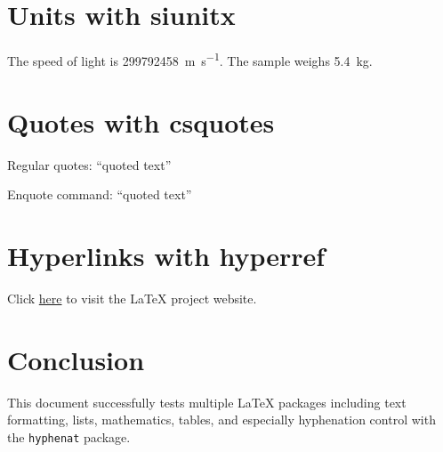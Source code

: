 \documentclass{article}
\begin{document}
    \section{Units with siunitx}
    The speed of light is \SI{299792458}{\meter\per\second}.
    The sample weighs \SI{5.4}{\kilo\gram}.

    \section{Quotes with csquotes}
    Regular quotes: ``quoted text''

    Enquote command: \enquote{quoted text}

    \section{Hyperlinks with hyperref}
    Click \href{https://www.latex-project.org/}{here} to visit the LaTeX project website.

    \section{Conclusion}
    This document successfully tests multiple LaTeX packages including text formatting, lists, mathematics, tables, and especially hyphenation control with the \texttt{hyphenat} package.
\end{document}
